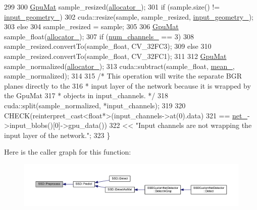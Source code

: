 \begin{DoxyCode}
299 
300     \mbox{\hyperlink{gpu__allocator_8h_aa7700da124206551c0f9d273152f13fb}{GpuMat}} sample\_resized(\mbox{\hyperlink{class_s_s_d_af45a3ca33b8adcb4b2e23ebd23891947}{allocator\_}});
301     \textcolor{keywordflow}{if} (sample.size() != \mbox{\hyperlink{class_s_s_d_a3fe828551a5a53a3f43a481ae5d2d96a}{input\_geometry\_}})
302         cuda::resize(sample, sample\_resized, \mbox{\hyperlink{class_s_s_d_a3fe828551a5a53a3f43a481ae5d2d96a}{input\_geometry\_}});
303     \textcolor{keywordflow}{else}
304         sample\_resized = sample;
305 
306     \mbox{\hyperlink{gpu__allocator_8h_aa7700da124206551c0f9d273152f13fb}{GpuMat}} sample\_float(\mbox{\hyperlink{class_s_s_d_af45a3ca33b8adcb4b2e23ebd23891947}{allocator\_}});
307     \textcolor{keywordflow}{if} (\mbox{\hyperlink{class_s_s_d_affe6f7e948b0040bd958db34758d8ab1}{num\_channels\_}} == 3)
308         sample\_resized.convertTo(sample\_float, CV\_32FC3);
309     \textcolor{keywordflow}{else}
310         sample\_resized.convertTo(sample\_float, CV\_32FC1);
311 
312     \mbox{\hyperlink{gpu__allocator_8h_aa7700da124206551c0f9d273152f13fb}{GpuMat}} sample\_normalized(\mbox{\hyperlink{class_s_s_d_af45a3ca33b8adcb4b2e23ebd23891947}{allocator\_}});
313     cuda::subtract(sample\_float, \mbox{\hyperlink{class_s_s_d_a3974a4a620cee93f5523c459482887e2}{mean\_}}, sample\_normalized);
314 
315     \textcolor{comment}{/* This operation will write the separate BGR planes directly to the}
316 \textcolor{comment}{     * input layer of the network because it is wrapped by the GpuMat}
317 \textcolor{comment}{     * objects in input\_channels. */}
318     cuda::split(sample\_normalized, *input\_channels);
319 
320     CHECK(reinterpret\_cast<float*>(input\_channels->at(0).data)
321           == \mbox{\hyperlink{class_s_s_d_a9b70501b85252c3135030e5c6c1e7117}{net\_}}->input\_blobs()[0]->gpu\_data())
322         << \textcolor{stringliteral}{"Input channels are not wrapping the input layer of the network."};
323 \}
\end{DoxyCode}
Here is the caller graph for this function\+:\nopagebreak
\begin{figure}[H]
\begin{center}
\leavevmode
\includegraphics[width=350pt]{class_s_s_d_a83cb8c64cda9b3792c5612613b56c828_icgraph}
\end{center}
\end{figure}
\mbox{\label{class_s_s_d_ada3debdd0e04185587f13b44a6b63765}} 
